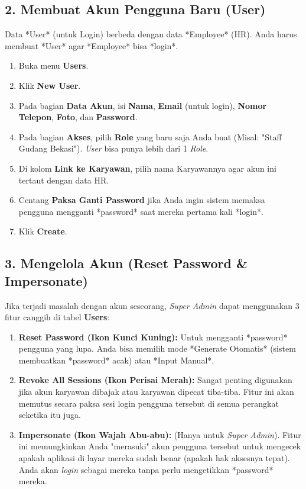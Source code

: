 \subsection{2. Membuat Akun Pengguna Baru (User)}
Data *User* (untuk Login) berbeda dengan data *Employee* (HR). Anda harus membuat *User* agar *Employee* bisa *login*.
\begin{enumerate}
    \item Buka menu \textbf{Users}.
    \item Klik \textbf{New User}.
    \item Pada bagian \textbf{Data Akun}, isi \textbf{Nama}, \textbf{Email} (untuk login), \textbf{Nomor Telepon}, \textbf{Foto}, dan \textbf{Password}.
    \item Pada bagian \textbf{Akses}, pilih \textbf{Role} yang baru saja Anda buat (Misal: "Staff Gudang Bekasi"). \textit{User} bisa punya lebih dari 1 \textit{Role}.
    \item Di kolom \textbf{Link ke Karyawan}, pilih nama Karyawannya agar akun ini tertaut dengan data HR.
    \item Centang \textbf{Paksa Ganti Password} jika Anda ingin sistem memaksa pengguna mengganti *password* saat mereka pertama kali *login*.
    \item Klik \textbf{Create}.
\end{enumerate}

\subsection{3. Mengelola Akun (Reset Password \& Impersonate)}
Jika terjadi masalah dengan akun seseorang, \textit{Super Admin} dapat menggunakan 3 fitur canggih di tabel \textbf{Users}:
\begin{enumerate}
    \item \textbf{Reset Password (Ikon Kunci Kuning):} Untuk mengganti *password* pengguna yang lupa. Anda bisa memilih mode *Generate Otomatis* (sistem membuatkan *password* acak) atau *Input Manual*.
    \item \textbf{Revoke All Sessions (Ikon Perisai Merah):} Sangat penting digunakan jika akun karyawan dibajak atau karyawan dipecat tiba-tiba. Fitur ini akan memutus secara paksa sesi login pengguna tersebut di semua perangkat seketika itu juga.
    \item \textbf{Impersonate (Ikon Wajah Abu-abu):} (Hanya untuk \textit{Super Admin}). Fitur ini memungkinkan Anda "merasuki" akun pengguna tersebut untuk mengecek apakah aplikasi di layar mereka sudah benar (apakah hak aksesnya tepat). Anda akan \textit{login} sebagai mereka tanpa perlu mengetikkan *password* mereka.
\end{enumerate}


